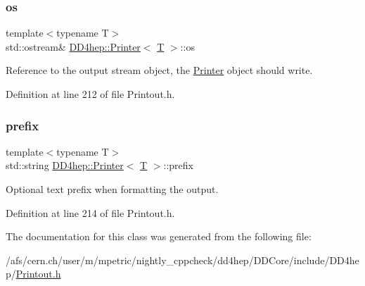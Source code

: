 \hypertarget{struct_d_d4hep_1_1_printer_a1ec1ad8ef8150a32854541bec0f9d7c8}{}\label{struct_d_d4hep_1_1_printer_a1ec1ad8ef8150a32854541bec0f9d7c8} 
\subsubsection{\texorpdfstring{os}{os}}
{\footnotesize\ttfamily template$<$typename T$>$ \\
std\+::ostream\& \hyperlink{struct_d_d4hep_1_1_printer}{D\+D4hep\+::\+Printer}$<$ \hyperlink{class_t}{T} $>$\+::os}



Reference to the output stream object, the \hyperlink{struct_d_d4hep_1_1_printer}{Printer} object should write. 



Definition at line 212 of file Printout.\+h.

\hypertarget{struct_d_d4hep_1_1_printer_a59b1bd251047feee01c469a91564a320}{}\label{struct_d_d4hep_1_1_printer_a59b1bd251047feee01c469a91564a320} 
\subsubsection{\texorpdfstring{prefix}{prefix}}
{\footnotesize\ttfamily template$<$typename T$>$ \\
std\+::string \hyperlink{struct_d_d4hep_1_1_printer}{D\+D4hep\+::\+Printer}$<$ \hyperlink{class_t}{T} $>$\+::prefix}



Optional text prefix when formatting the output. 



Definition at line 214 of file Printout.\+h.



The documentation for this class was generated from the following file\+:\begin{DoxyCompactItemize}
\item 
/afs/cern.\+ch/user/m/mpetric/nightly\+\_\+cppcheck/dd4hep/\+D\+D\+Core/include/\+D\+D4hep/\hyperlink{_printout_8h}{Printout.\+h}\end{DoxyCompactItemize}
